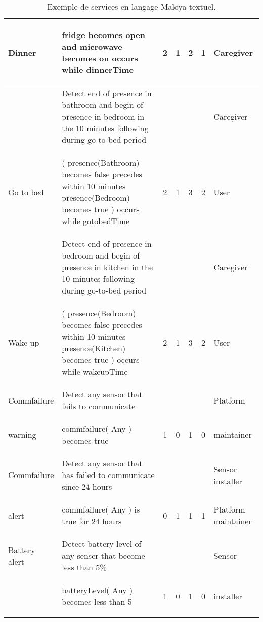 \begin{table*}[!h]
\begin{tabular}{|p{1.45cm}|p{8cm}|c|c|c|c|p{1.65cm}|}
    Dinner& \begin{mtext}  
      {fridge becomes open and microwave becomes on} occurs while dinnerTime
    \end{mtext} & 2& 1& 2&1& Caregiver \\
    \hline
    &\cellcolor{gray!15} Detect end of presence in bathroom and begin of presence in bedroom in the 10 minutes following during go-to-bed period & & & & &Caregiver \\ %
     Go to bed&  \begin{mtext} 
      ( presence(Bathroom) becomes false precedes within 10 minutes presence(Bedroom) becomes true ) occurs while gotobedTime
    \end{mtext} & 2& 1& 3& 2& User\\
    \hline
     &\cellcolor{gray!15} Detect end of presence in bedroom and begin of presence in kitchen in the 10 minutes following during go-to-bed period & & & &  & Caregiver \\ %
    Wake-up& \begin{mtext} 
      ( presence(Bedroom) becomes false precedes within 10 minutes presence(Kitchen) becomes true ) occurs while wakeupTime
    \end{mtext}&2 &1 &3 &2&User \\
    \hline
    Commfailure &\cellcolor{gray!15} Detect any sensor that fails to communicate & & & & & Platform \\%
      warning& \begin{mtext}  
        commfailure( Any ) becomes true 
        \end{mtext}& 1 & 0&1 &0& maintainer \\
    \hline
    Commfailure &\cellcolor{gray!15} Detect any sensor that has failed to communicate since 24 hours & & & & & Sensor installer \\ %
      alert&  \begin{mtext} 
        commfailure( Any ) is true for 24 hours 
        \end{mtext}& 0& 1& 1&1& Platform maintainer\\
    \hline
    Battery alert & \cellcolor{gray!15} Detect battery level of any senser that become less than 5\% & &  &  &  & Sensor\\ %
     & \begin{mtext}
      batteryLevel( Any ) becomes less than 5 
      \end{mtext}&1 &0 &1 & 0& installer\\
    \hline
  \end{tabular}
  \caption{Exemple de services en langage Maloya textuel.}
  \label{app_examples}
\end{table*}
